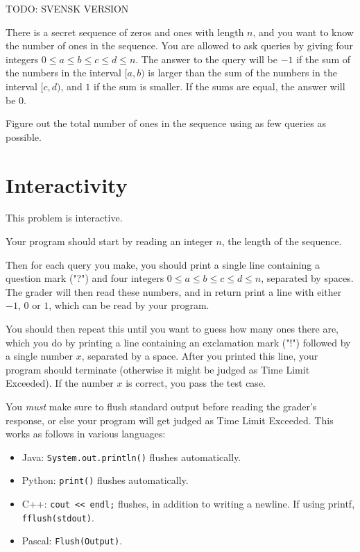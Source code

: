 TODO: SVENSK VERSION

There is a secret sequence of zeros and ones with length $n$, and you want to know the number of ones in the sequence.
You are allowed to ask queries by giving four integers $0 \leq a \leq b \leq c \leq d \leq n$. The answer
to the query will be $-1$ if the sum of the numbers in the interval $[a,b)$ is larger than the sum of the numbers
in the interval $[c,d)$, and $1$ if the sum is smaller. If the sums are equal, the answer will be $0$.

Figure out the total number of ones in the sequence using as few queries as possible.

\section*{Interactivity}
This problem is interactive.

Your program should start by reading an integer $n$, the length of the sequence.

Then for each query you make, you should print a single line containing a question mark ("?") and
four integers $0 \leq a \leq b \leq c \leq d \leq n$, separated by spaces.
The grader will then read these numbers, and in return print a line with either $-1$, $0$ or $1$, which can be read by your program.

You should then repeat this until you want to guess how many ones there are,
which you do by printing a line containing an exclamation mark ("!") followed by a single number $x$, separated by a space.
After you printed this line, your program should terminate (otherwise it might be judged as Time Limit Exceeded).
If the number $x$ is correct, you pass the test case.

You \emph{must} make sure to flush standard output before reading the grader's response, or else your program
will get judged as Time Limit Exceeded. This works as follows in various languages:
\begin{itemize}
  \item Java: \texttt{System.out.println()} flushes automatically.
  \item Python: \texttt{print()} flushes automatically.
  \item C++: \texttt{cout << endl;} flushes, in addition to writing a newline. If using printf, \texttt{fflush(stdout)}.
  \item Pascal: \texttt{Flush(Output)}.
\end{itemize}

